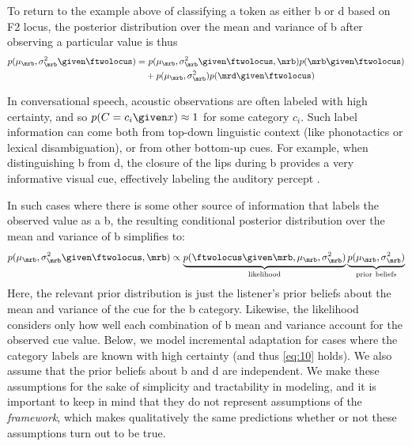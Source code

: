 To return to the example above of classifying a token as either \ph b or \ph d based on F2 locus, the posterior distribution over the mean and variance of \ph b after observing a particular \ftwolocus value is thus
\begin{align*}
  p(\mu_\mrb, \sigma^2_\mrb \given \ftwolocus) = &\  p(\mu_\mrb, \sigma^2_\mrb \given \ftwolocus, \mrb) p(\mrb \given \ftwolocus) \\
&+ p(\mu_\mrb, \sigma^2_\mrb) p(\mrd \given \ftwolocus)
\end{align*}

In conversational speech, acoustic observations are often labeled with high certainty, and so $p(C=c_i \given x) \approx 1$ for some category $c_i$.  Such label information can come both from top-down linguistic context (like phonotactics or lexical disambiguation), or from other bottom-up cues.  For example, when distinguishing \ph b from \ph d, the closure of the lips during \ph b provides a very informative visual cue, effectively labeling the auditory percept \cite{Vroomen2004}.

In such cases where there is some other source of information that labels the observed \ftwolocus value as a \ph b, the resulting conditional posterior distribution over the mean and variance of \ph b simplifies to:
\begin{equation}
  \label{eq:10}
  p(\mu_\mrb, \sigma^2_\mrb \given \ftwolocus, \mrb) \propto
  \underbrace{p(\ftwolocus \given \mrb, \mu_\mrb, \sigma^2_\mrb)}_\mathrm{likelihood}
  \underbrace{p(\mu_\mrb, \sigma^2_\mrb)}_\mathrm{prior\ beliefs}
\end{equation}
Here, the relevant prior distribution is just the listener's prior beliefs about the mean and variance of the \ftwolocus cue for the \ph b category.  Likewise, the likelihood considers only how well each combination of \ph b mean and variance account for the observed cue value.  Below, we model incremental adaptation for cases where the category labels are known with high certainty (and thus \eqref{eq:10} holds).  We also assume that the prior beliefs about \ph b and \ph d are independent.  We make these assumptions for the sake of simplicity and tractability in modeling, and it is important to keep in mind that they do not represent assumptions of the \emph{framework}, which makes qualitatively the same predictions whether or not these assumptions turn out to be true.

